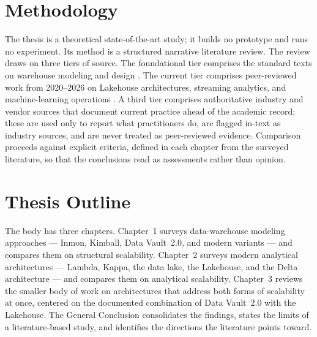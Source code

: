 \section*{Methodology}
\label{sec:intro-methodology}

The thesis is a theoretical state-of-the-art study; it builds no prototype and runs no experiment. Its method is a structured narrative literature review. The review draws on three tiers of source. The foundational tier comprises the standard texts on warehouse modeling and design \parencite{inmon2005, kimball2013, linstedt2015, golfarelli2009}. The current tier comprises peer-reviewed work from 2020--2026 on Lakehouse architectures, streaming analytics, and machine-learning operations \parencite{armbrust2021, schneider2024, harby2024, nambiar2022}. A third tier comprises authoritative industry and vendor sources that document current practice ahead of the academic record; these are used only to report what practitioners do, are flagged in-text as industry sources, and are never treated as peer-reviewed evidence. Comparison proceeds against explicit criteria, defined in each chapter from the surveyed literature, so that the conclusions read as assessments rather than opinion.

\section*{Thesis Outline}
\label{sec:intro-outline}

The body has three chapters. Chapter~1 surveys data-warehouse modeling approaches --- Inmon, Kimball, Data Vault~2.0, and modern variants --- and compares them on structural scalability. Chapter~2 surveys modern analytical architectures --- Lambda, Kappa, the data lake, the Lakehouse, and the Delta architecture --- and compares them on analytical scalability. Chapter~3 reviews the smaller body of work on architectures that address both forms of scalability at once, centered on the documented combination of Data Vault~2.0 with the Lakehouse. The General Conclusion consolidates the findings, states the limits of a literature-based study, and identifies the directions the literature points toward.
